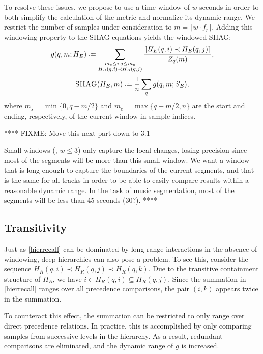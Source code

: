\documentclass{article}
\def\shag{\ensuremath{\text{\textsc{SHAG}}}}
\begin{document}
To resolve these issues, we propose to use a time window of $w$ seconds in order to both simplify the 
calculation of the metric and normalize its dynamic range.
We restrict the number of samples under consideration to $m = \lceil w \cdot f_r \rceil$.
Adding this windowing property to the SHAG equations yields the windowed SHAG:
\begin{equation}
  g(q, m ; H_E) \defeq \sum_{\substack{
  m_s \leq i,j \leq m_e \\ 
  H_R(q, i) \prec H_R(q, j) }} \frac{\ind{H_E(q, i) \prec H_E(q,
  j)}}{Z_q(m)},\label{windowrecall}
\end{equation}
\begin{equation}
\shag(H_E, m) \defeq \frac{1}{n} \sum_q g(q,m ; S_E),
\end{equation}
where $m_s = \min\{0,q-m/2\}$ and $m_e = \max\{q+m/2,n\}$ are the start and ending, respectively, of the current window in sample indices.

****
FIXME: Move this next part down to 3.1

Small windows (\eg, $w \leq 3$) only capture the local changes, losing precision since most of the segments will be more than this small window.
We want a window that is long enough to capture the boundaries of the current segments, and that is the same for all tracks in order to be able to easily compare results within a reasonable dynamic range.
In the task of music segmentation, most of the segments will be less than 45 seconds (30?).
****

\subsection{Transitivity}

Just as \cref{hierrecall} can be dominated by long-range interactions in the absence
of windowing, deep hierarchies can also pose a problem.  To see this, consider the 
sequence $H_R(q, i) \prec H_R(q, j) \prec H_R(q, k)$.  Due to the transitive
containment structure of $H_R$, we have $i \in H_R(q, i) \subseteq H_R(q, j)$.
Since the summation in \cref{hierrecall} ranges over all precedence comparisons, the
pair $(i, k)$ appears twice in the summation.  

To counteract this effect, the summation can be restricted to only range over direct
precedence relations.  In practice, this is accomplished by only comparing samples from
successive levels in the hierarchy.  As a result, redundant comparisons are
eliminated, and the dynamic range of $g$ is increased.
\end{document}
